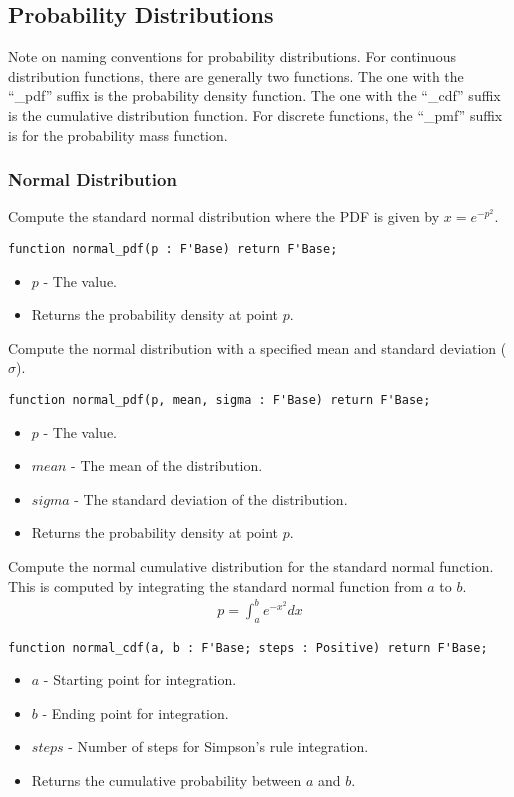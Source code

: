 \documentclass[10pt, openany]{book}
\begin{document}
\subsection{Probability Distributions}
Note on naming conventions for probability distributions.  For continuous distribution functions, there are generally two functions.  The one with the ``\_pdf'' suffix is the probability density function.  The one with the ``\_cdf'' suffix is the cumulative distribution function.  For discrete functions, the ``\_pmf'' suffix is for the probability mass function.

\subsubsection{Normal Distribution}
Compute the standard normal distribution where the PDF is given by $x = e^{-p^2}$.
\begin{lstlisting}
function normal_pdf(p : F'Base) return F'Base;
\end{lstlisting}
\begin{itemize}
  \item $p$ - The value.
  \item Returns the probability density at point $p$.
\end{itemize}

Compute the normal distribution with a specified mean and standard deviation ($\sigma$).
\begin{lstlisting}
function normal_pdf(p, mean, sigma : F'Base) return F'Base;
\end{lstlisting}
\begin{itemize}
  \item $p$ - The value.
  \item $mean$ - The mean of the distribution.
  \item $sigma$ - The standard deviation of the distribution.
  \item Returns the probability density at point $p$.
\end{itemize}

Compute the normal cumulative distribution for the standard normal function.  This is computed by integrating the standard normal function from $a$ to $b$.
\begin{align*}
  p = \int^b_a e^{-x^2} dx
\end{align*}
\begin{lstlisting}
function normal_cdf(a, b : F'Base; steps : Positive) return F'Base;
\end{lstlisting}
\begin{itemize}
  \item $a$ - Starting point for integration.
  \item $b$ - Ending point for integration.
  \item $steps$ - Number of steps for Simpson's rule integration.
  \item Returns the cumulative probability between $a$ and $b$.
\end{itemize}
\end{document}
